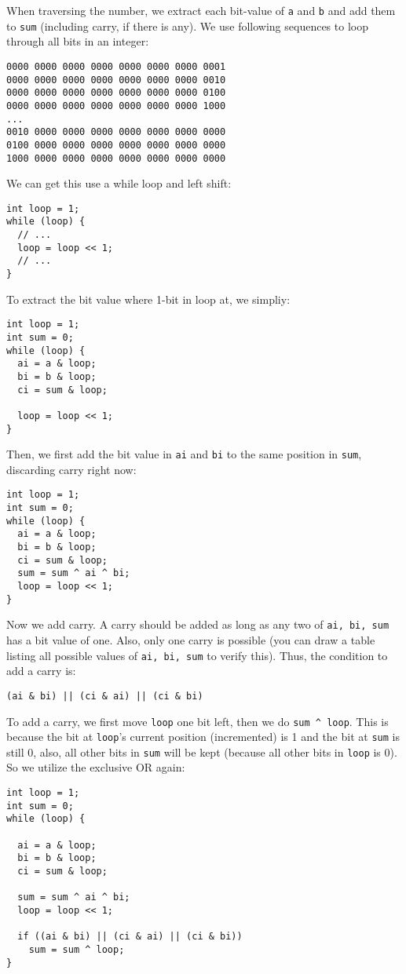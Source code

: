 \documentclass[12pt]{article}
\begin{document}
When traversing the number, we extract each bit-value of \texttt{a} and \texttt{b} and add them to \texttt{sum} (including carry, if there is any). We use following sequences to loop through all bits in an integer:
\begin{verbatim}
0000 0000 0000 0000 0000 0000 0000 0001
0000 0000 0000 0000 0000 0000 0000 0010
0000 0000 0000 0000 0000 0000 0000 0100
0000 0000 0000 0000 0000 0000 0000 1000
...
0010 0000 0000 0000 0000 0000 0000 0000
0100 0000 0000 0000 0000 0000 0000 0000
1000 0000 0000 0000 0000 0000 0000 0000
\end{verbatim}
We can get this use a while loop and left shift:
\begin{verbatim}
int loop = 1;
while (loop) {
  // ...
  loop = loop << 1;
  // ...
}
\end{verbatim}

To extract the bit value where 1-bit in loop at, we simpliy:
\begin{verbatim}
int loop = 1;
int sum = 0;
while (loop) {
  ai = a & loop;
  bi = b & loop;
  ci = sum & loop;

  loop = loop << 1;
}
\end{verbatim}

Then, we first add the bit value in \texttt{ai} and \texttt{bi} to the same position in \texttt{sum}, discarding carry right now:
\begin{verbatim}
int loop = 1;
int sum = 0;
while (loop) {
  ai = a & loop;
  bi = b & loop;
  ci = sum & loop;
  sum = sum ^ ai ^ bi;
  loop = loop << 1;
}
\end{verbatim}

Now we add carry. A carry should be added as long as any two of \texttt{ai, bi, sum} has a bit value of one. Also, only one carry is possible (you can draw a table listing all possible values of \texttt{ai, bi, sum} to verify this). Thus, the condition to add a carry is:
\begin{verbatim}
(ai & bi) || (ci & ai) || (ci & bi)
\end{verbatim}
To add a carry, we first move \texttt{loop} one bit left, then we do \texttt{sum \textasciicircum{} loop}. This is because the bit at \texttt{loop}'s current position (incremented) is 1 and the bit at \texttt{sum} is still 0, also, all other bits in \texttt{sum} will be kept (because all other bits in \texttt{loop} is 0). So we utilize the exclusive OR again:
\begin{verbatim}
int loop = 1;
int sum = 0;
while (loop) {

  ai = a & loop;
  bi = b & loop;
  ci = sum & loop;

  sum = sum ^ ai ^ bi;
  loop = loop << 1;

  if ((ai & bi) || (ci & ai) || (ci & bi))
    sum = sum ^ loop;
}
\end{verbatim}
\end{document}
